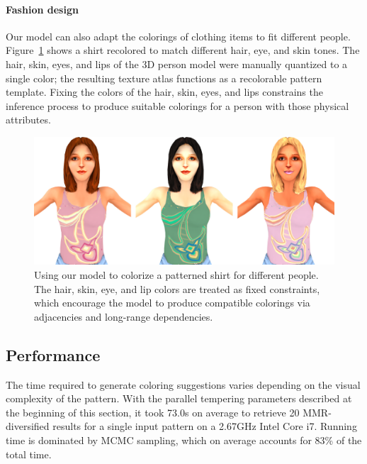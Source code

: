 \paragraph{Fashion design}
Our model can also adapt the colorings of clothing items to fit different people. Figure~\ref{fig:fashion} shows a shirt recolored to match different hair, eye, and skin tones. The hair, skin, eyes, and lips of the 3D person model were manually quantized to a single color; the resulting texture atlas functions as a recolorable pattern template. Fixing the colors of the hair, skin, eyes, and lips constrains the inference process to produce suitable colorings for a person with those physical attributes.

\begin{figure}[ht!]
\centering
\includegraphics[width=\columnwidth]{figs/fashion/composite}
\caption{Using our model to colorize a patterned shirt for different people. The hair, skin, eye, and lip colors are treated as fixed constraints, which encourage the model to produce compatible colorings via adjacencies and long-range dependencies.}
\label{fig:fashion}
\vspace{-1.0em}
\end{figure}

\subsection{Performance}

The time required to generate coloring suggestions varies depending on the visual complexity of the pattern. With the parallel tempering parameters described at the beginning of this section, it took 73.0s on average to retrieve 20 MMR-diversified results for a single input pattern on a 2.67GHz Intel Core i7. Running time is dominated by MCMC sampling, which on average accounts for 83\% of the total time.

